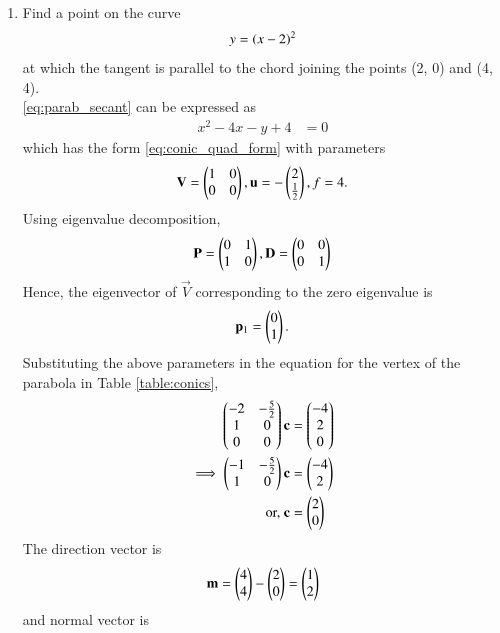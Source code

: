 \begin{enumerate}[label=\thesection.\arabic*.,ref=\thesection.\theenumi]
\item 
Find a point on the curve 
\begin{align}
y = \left(x-2\right)^2
\label{eq:parab_secant}
\end{align}
at which the tangent is parallel to the chord joining the points (2, 0) and (4, 4).
\\
\solution \eqref{eq:parab_secant} can be expressed as
\begin{align}
x^2  -4x - y + 4 &= 0
\label{eq:parab_secant_twovar}
\end{align}
which has the form \eqref{eq:conic_quad_form} with parameters
\begin{align}
\mathbf{V} = \begin{pmatrix}1 & 0\\0 & 0\end{pmatrix},  \mathbf{u} = -\begin{pmatrix}2\\\frac{1}{2}\end{pmatrix}, f = 4.
\label{eq:parab_secant_twovar_params}
\end{align}
Using eigenvalue decomposition, 
\begin{align}
\mathbf{P} = \begin{pmatrix}0 & 1\\1 & 0\end{pmatrix}, \mathbf{D} = \begin{pmatrix}0 & 0\\0 & 1\end{pmatrix}
\end{align}
%
Hence, the eigenvector of $\vec{V}$ corresponding to the zero eigenvalue is
\begin{align}
\mathbf{p}_1 = \begin{pmatrix}0\\1\end{pmatrix}.
\end{align}
Substituting the above parameters in the equation for the vertex of the parabola in Table \ref{table:conics},
\begin{align}
\begin{pmatrix}-2 & -\frac{5}{2} \\ 1 & 0 \\ 0 & 0\end{pmatrix}\mathbf{c} &= \begin{pmatrix}-4 \\ 2 \\ 0\end{pmatrix}
\\
\implies \begin{pmatrix}-1 & -\frac{5}{2} \\ 1 & 0\end{pmatrix}\mathbf{c} &= \begin{pmatrix}-4 \\ 2 \end{pmatrix}
\\
\text{or, } \mathbf{c} &= \begin{pmatrix}2\\0\end{pmatrix}
\end{align}
The direction vector is
\begin{align}
\mathbf{m} = \begin{pmatrix}4 \\ 4\end{pmatrix}-\begin{pmatrix}2 \\ 0\end{pmatrix} = \begin{pmatrix}1\\2\end{pmatrix}
\label{eq:parab_secant_twovar_m}
\end{align}
and normal vector is
\begin{align}

\end{align}
\end{enumerate}

